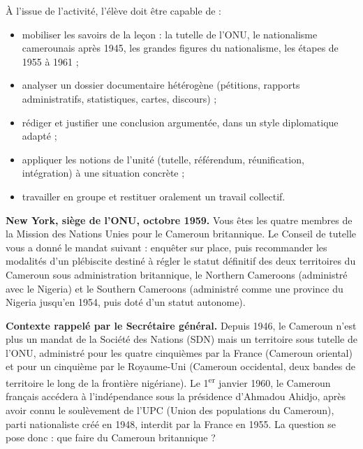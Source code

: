 \documentclass[11pt]{article}
\newcommand{\cle}[1]{{\popxbold\color{popdark}#1}}
\newcounter{popsec}
\newcounter{popsub}
\newcommand{\courssub}[1]{%
  \stepcounter{popsub}%
  \par\vspace{9pt}\noindent{\popxbold\fontsize{11.5}{13}\selectfont\color{popink}{\color{poporange}\thepopsec.\thepopsub}\hspace{6pt}#1}\par\nopagebreak\vspace{4pt}
}
\begin{document}
À l'issue de l'activité, l'élève doit être capable de :
\begin{itemize}
\item mobiliser les savoirs de la leçon : la tutelle de l'ONU, le nationalisme camerounais après 1945, les grandes figures du nationalisme, les étapes de 1955 à 1961 ;
\item analyser un dossier documentaire hétérogène (pétitions, rapports administratifs, statistiques, cartes, discours) ;
\item rédiger et justifier une conclusion argumentée, dans un style diplomatique adapté ;
\item appliquer les notions de l'unité (\cle{tutelle}, \cle{référendum}, \cle{réunification}, \cle{intégration}) à une situation concrète ;
\item travailler en groupe et restituer oralement un travail collectif.
\end{itemize}

\courssub{Situation}

\textbf{New York, siège de l'ONU, octobre 1959.} Vous êtes les quatre membres de la \cle{Mission des Nations Unies pour le Cameroun britannique}. Le Conseil de tutelle vous a donné le mandat suivant : enquêter sur place, puis recommander les modalités d'un plébiscite destiné à régler le statut définitif des deux territoires du Cameroun sous administration britannique, le \cle{Northern Cameroons} (administré avec le Nigeria) et le \cle{Southern Cameroons} (administré comme une province du Nigeria jusqu'en 1954, puis doté d'un statut autonome).

\textbf{Contexte rappelé par le Secrétaire général.} Depuis 1946, le Cameroun n'est plus un mandat de la Société des Nations (SDN) mais un territoire sous \cle{tutelle} de l'ONU, administré pour les quatre cinquièmes par la France (\cle{Cameroun oriental}) et pour un cinquième par le Royaume-Uni (\cle{Cameroun occidental}, deux bandes de territoire le long de la frontière nigériane). Le 1\textsuperscript{er} janvier 1960, le Cameroun français accédera à l'indépendance sous la présidence d'\cle{Ahmadou Ahidjo}, après avoir connu le soulèvement de l'\cle{UPC} (Union des populations du Cameroun), parti nationaliste créé en 1948, interdit par la France en 1955. La question se pose donc : que faire du Cameroun britannique ?
\end{document}
